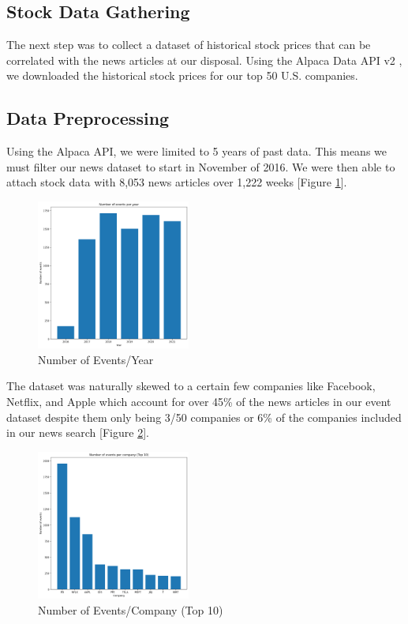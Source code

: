\documentclass[conference]{IEEEtran}
\begin{document}
\subsection{Stock Data Gathering}
The next step was to collect a dataset of historical stock prices that can be correlated with the news articles at our disposal. Using the Alpaca Data API v2 \cite{alpacadataapi}, we downloaded the historical stock prices for our top 50 U.S. companies. 
\subsection{Data Preprocessing}
Using the Alpaca API, we were limited to 5 years of past data. This means we must filter our news dataset to start in November of 2016. We were then able to attach stock data with 8,053 news articles over 1,222 weeks [Figure \ref{fig:eventsPerYear}].
\begin{figure}[h]
    \centering
    \includegraphics[width=0.45\textwidth]{eventsPerYear.png}
    \caption{Number of Events/Year}
    \label{fig:eventsPerYear}
\end{figure}

The dataset was naturally skewed to a certain few companies like Facebook, Netflix, and Apple which account for over 45\% of the news articles in our event dataset despite them only being 3/50 companies or 6\% of the companies included in our news search [Figure \ref{fig:eventsPerCompany}]. 

\begin{figure}[ht]
    \centering
    \includegraphics[width=0.45\textwidth]{eventsPerCompany.png}
    \caption{Number of Events/Company (Top 10)}
    \label{fig:eventsPerCompany}
\end{figure}
\end{document}
